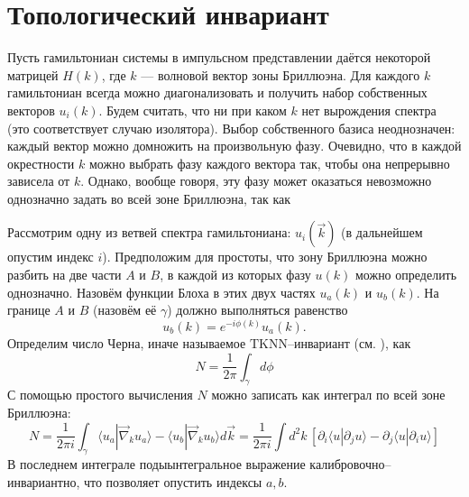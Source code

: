 \section{Топологический инвариант}
Пусть гамильтониан системы в импульсном представлении даётся некоторой
матрицей $H(k)$, где $k$ --- волновой вектор зоны Бриллюэна.  
Для каждого $k$ гамильтониан всегда можно диагонализовать
и получить набор собственных векторов $u_i(k)$. Будем считать, что ни при каком $k$ нет 
вырождения спектра (это соответствует случаю изолятора). 
Выбор собственного базиса неоднозначен: каждый вектор
можно домножить на произвольную фазу. Очевидно, что в каждой окрестности $k$ можно выбрать
фазу каждого вектора так, чтобы она непрерывно зависела от $k$. Однако, вообще говоря, 
эту фазу может оказаться невозможно однозначно задать во всей зоне Бриллюэна, так как 

Рассмотрим одну из ветвей спектра гамильтониана: $u_i(\vec{k})$ 
(в дальнейшем опустим индекс $i$). Предположим для простоты, что зону Бриллюэна
можно разбить на две части $A$ и $B$, 
в каждой из которых фазу $u(k)$  можно определить однозначно. 
Назовём функции Блоха в этих двух частях $u_a(k)$ и $u_b(k)$. На границе $A$ и $B$ (назовём
её $\gamma$) должно выполняться равенство
\begin{equation}
   u_b(k) = e^{-i\phi(k)}u_a(k).
\end{equation}
Определим число Черна, иначе называемое $\mathrm{TKNN}$--инвариант 
(см. \cite{Kohmoto1985, Thouless1982}), как
\begin{equation}
    N = \frac{1}{2\pi}\int_\gamma d\phi
\end{equation}
С помощью простого вычисления %
$N$ можно записать как интеграл по всей зоне Бриллюэна:
\begin{equation}
    N = \frac{1}{2\pi i}\int_\gamma \langle u_a |\vec{\nabla}_k u_a \rangle  - 
                             \langle u_b |\vec{\nabla}_k u_b \rangle d\vec{k} = 
        \frac{1}{2\pi i} 
            \int d^2 k\, \left[\partial_i \langle u | \partial_j u \rangle -
            \partial_j \langle u | \partial_i u \rangle \right]
\end{equation}
В последнем интеграле подыынтегральное выражение калибровочно--инвариантно, что
позволяет опустить индексы $a,b$. 

